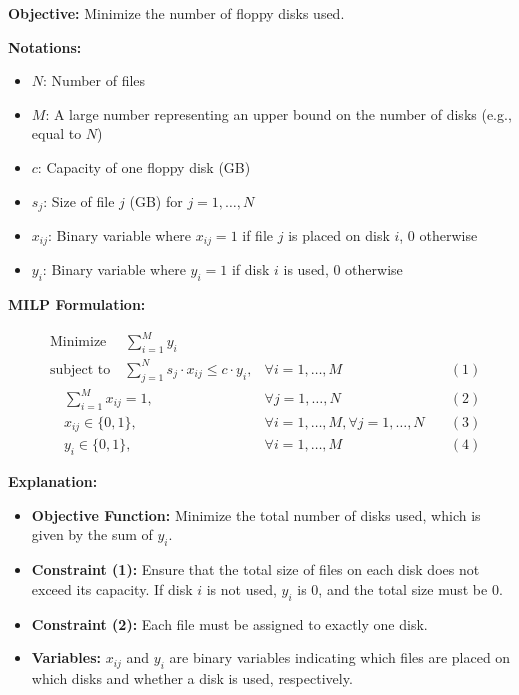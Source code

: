 \documentclass{article}
\begin{document}
\textbf{Objective:} Minimize the number of floppy disks used.

\textbf{Notations:}
\begin{itemize}
    \item $N$: Number of files
    \item $M$: A large number representing an upper bound on the number of disks (e.g., equal to $N$)
    \item $c$: Capacity of one floppy disk (GB)
    \item $s_j$: Size of file $j$ (GB) for $j = 1, \ldots, N$
    \item $x_{ij}$: Binary variable where $x_{ij} = 1$ if file $j$ is placed on disk $i$, 0 otherwise
    \item $y_i$: Binary variable where $y_i = 1$ if disk $i$ is used, 0 otherwise
\end{itemize}

\textbf{MILP Formulation:}

\begin{align}
    &\text{Minimize } \quad \sum_{i=1}^{M} y_i && \\
    &\text{subject to} \quad \sum_{j=1}^{N} s_j \cdot x_{ij} \leq c \cdot y_i, & \forall i = 1, \ldots, M \quad &(1)\\
    &\quad \sum_{i=1}^{M} x_{ij} = 1, & \forall j = 1, \ldots, N \quad &(2)\\
    &\quad x_{ij} \in \{0, 1\}, & \forall i = 1, \ldots, M, \forall j = 1, \ldots, N \quad &(3)\\
    &\quad y_i \in \{0, 1\}, & \forall i = 1, \ldots, M \quad &(4)
\end{align}

\textbf{Explanation:}
\begin{itemize}
    \item \textbf{Objective Function:} Minimize the total number of disks used, which is given by the sum of $y_i$.
    \item \textbf{Constraint (1):} Ensure that the total size of files on each disk does not exceed its capacity. If disk $i$ is not used, $y_i$ is 0, and the total size must be 0.
    \item \textbf{Constraint (2):} Each file must be assigned to exactly one disk.
    \item \textbf{Variables:} $x_{ij}$ and $y_i$ are binary variables indicating which files are placed on which disks and whether a disk is used, respectively.
\end{itemize}
\end{document}
